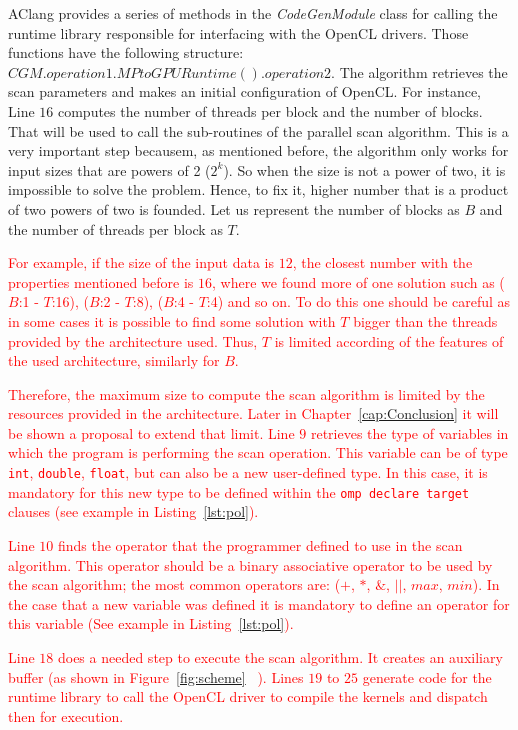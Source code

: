 \documentclass[Ingles]{ic-tese-v1}
\newcommand{\ed}[1]{\noindent\textcolor{red}{ {#1}}}
\newcommand{\ed}[1]{}
\newcommand{\rcap}[1]{Chapter~\ref{cap:#1}}
\newcommand{\rfig}[1]{Figure~\ref{fig:#1}}
\newcommand{\ttt}[1]{{\texttt{#1}}}
\newcommand{\rlst}[1]{Listing~\ref{lst:#1}}
\begin{document}
AClang provides a series of methods in the {\it CodeGenModule} class for
calling the runtime library responsible for interfacing with the OpenCL
drivers. Those functions have the following structure:
$CGM.operation1.MPtoGPURuntime().operation2$. The algorithm retrieves the scan
parameters and makes an initial configuration of OpenCL. For instance, Line $16$ computes
the number of threads per block and the number of blocks. That will be used to
call the sub-routines of the parallel scan algorithm. This is a very important
step becausem, as mentioned before, the algorithm only works for input sizes that
are powers of 2 ($2^{k}$). So when the size is not a power of two, it is
impossible to solve the problem. Hence, to fix it, 
higher number that is a product of two powers of two is founded. Let us represent the
number of blocks as $B$ and the number of threads per block as $T$.

\ed{For example, if the size of the input data is $12$, the closest number with the
properties mentioned before is $16$, where we found more of one solution such
as ($B$:1 - $T$:16), ($B$:2 - $T$:8), ($B$:4 - $T$:4) and so on.  To do this one should
be careful as in some cases it is possible to find some solution with $T$ bigger than the threads
provided by the architecture used.  Thus, $T$ is limited according of the  features of the 
used architecture, similarly for $B$.}

\ed{Therefore, the maximum size to compute the scan algorithm is limited by the
resources provided in the architecture. Later in \rcap{Conclusion} it will be shown
a proposal to extend that limit.  Line $9$ retrieves the type of variables in
which the program is performing the scan operation. This variable can be of
type  \ttt{int},  \ttt{double},  \ttt{float}, but can also be a new user-defined type. In this case,
it is mandatory for this new type to be defined within the \ttt{omp declare target}
clauses (see example in \rlst{pol}).}

\ed{Line $10$ finds the operator that the programmer defined to use in the scan
algorithm. This operator should be a binary associative operator to be used
by the scan algorithm; the most common operators are: ($+$, $*$, $\&$, $||$,
$max$, $min$). In the case that a new variable was defined it is mandatory
to define an operator for this variable (See example in \rlst{pol}).}

\ed{Line $18$ does a needed step to execute the scan algorithm. It creates an
auxiliary buffer (as shown in \rfig{scheme} ~\ding{183}).  Lines $19$ to $25$
generate code for the runtime library to call the OpenCL driver to compile the
kernels and dispatch then for execution.}
\end{document}
